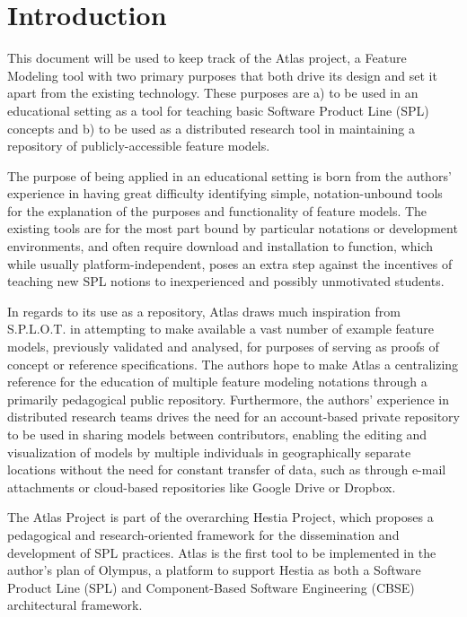\chapter*{Introduction}

This document will be used to keep track of the Atlas project, a Feature Modeling tool with two primary purposes that both drive its design and set it apart from the existing technology. These purposes are a) to be used in an educational setting as a tool for teaching basic Software Product Line (SPL) concepts and b) to be used as a distributed research tool in maintaining a repository of publicly-accessible feature models.

The purpose of being applied in an educational setting is born from the authors' experience in having great difficulty identifying simple, notation-unbound tools for the explanation of the purposes and functionality of feature models. The existing tools are for the most part bound by particular notations or development environments, and often require download and installation to function, which while usually platform-independent, poses an extra step against the incentives of teaching new SPL notions to inexperienced and possibly unmotivated students.

In regards to its use as a repository, Atlas draws much inspiration from S.P.L.O.T. \cite{MENDONCA:2009} in attempting to make available a vast number of example feature models, previously validated and analysed, for purposes of serving as proofs of concept or reference specifications. The authors hope to make Atlas a centralizing reference for the education of multiple feature modeling notations through a primarily pedagogical public repository. Furthermore, the authors' experience in distributed research teams drives the need for an account-based private repository to be used in sharing models between contributors, enabling the editing and visualization of models by multiple individuals in geographically separate locations without the need for constant transfer of data, such as through e-mail attachments or cloud-based repositories like Google Drive or Dropbox.

The Atlas Project is part of the overarching Hestia Project, which proposes a pedagogical and research-oriented framework for the dissemination and development of SPL practices. Atlas is the first tool to be implemented in the author's plan of Olympus, a platform to support Hestia as both a Software Product Line (SPL) and Component-Based Software Engineering (CBSE) architectural framework.

